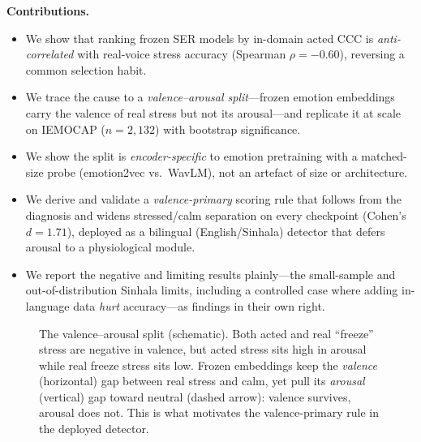 \documentclass[conference]{IEEEtran}
\begin{document}
\medskip
\noindent\textbf{Contributions.}
\begin{itemize}
  \item We show that ranking frozen SER models by in-domain acted CCC is
  \emph{anti-correlated} with real-voice stress accuracy (Spearman
  $\rho = -0.60$), reversing a common selection habit.
  \item We trace the cause to a \emph{valence--arousal split}---frozen emotion
  embeddings carry the valence of real stress but not its arousal---and replicate
  it at scale on IEMOCAP ($n = 2{,}132$) with bootstrap significance.
  \item We show the split is \emph{encoder-specific} to emotion pretraining with a
  matched-size probe (emotion2vec vs.\ WavLM), not an artefact of size or
  architecture.
  \item We derive and validate a \emph{valence-primary} scoring rule that follows
  from the diagnosis and widens stressed/calm separation on every checkpoint
  (Cohen's $d = 1.71$), deployed as a bilingual (English/Sinhala) detector that
  defers arousal to a physiological module.
  \item We report the negative and limiting results plainly---the small-sample and
  out-of-distribution Sinhala limits, including a controlled case where adding
  in-language data \emph{hurt} accuracy---as findings in their own right.
\end{itemize}

\begin{figure}[t]
\centering
{}
\caption{The valence--arousal split (schematic). Both acted and real ``freeze''
stress are negative in valence, but acted stress sits high in arousal while real
freeze stress sits low. Frozen embeddings keep the \emph{valence} (horizontal)
gap between real stress and calm, yet pull its \emph{arousal} (vertical) gap toward
neutral (dashed arrow): valence survives, arousal does not. This is what motivates
the valence-primary rule in the deployed detector.}
\label{fig:concept}
\end{figure}
\end{document}
